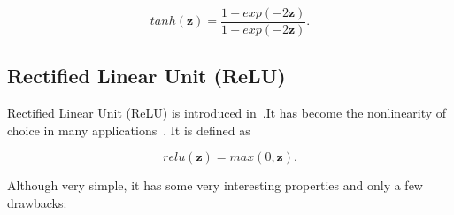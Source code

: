 \begin{equation}\label{eq:tanh}
    tanh(\mathbf{z}) = \frac{1-exp(-2\mathbf{z})}{1+exp(-2\mathbf{z})}.
\end{equation}


\subsection{Rectified Linear Unit (ReLU)}\label{sec:relu}
Rectified Linear Unit (ReLU) is introduced in~\cite{krizhevsky2012imagenet}.It has become the nonlinearity of choice in many applications~\cite{krizhevsky2012imagenet}\cite{he2016deep}. It is defined as

\begin{equation}\label{eq:relu}
    relu(\mathbf{z}) = max(0, \mathbf{z}).
\end{equation}

Although very simple, it has some very interesting properties\cite{he2015delving} and only a few drawbacks:

